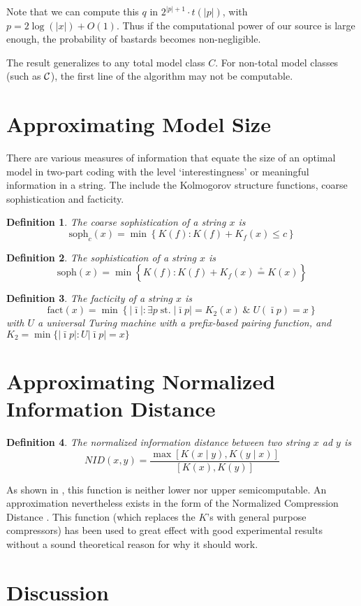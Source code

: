 \documentclass[10pt,a4paper,oneside]{article}
\newtheorem{dfn}{Definition}
\begin{document}
Note that we can compute this $q$ in $2^{|p|+1}\cdot t(|p|)$, with $p = 2 \log(|x|) + O(1)$. Thus if the computational power of our source is large enough, the probability of bastards becomes non-negligible.

The result generalizes to any total model class $C$. For non-total model classes (such as $\cal C$), the first line of the algorithm may not be computable. 


\section*{Approximating Model Size}

There are various measures of information that equate the size of an optimal model in two-part coding with the level `interestingness' or meaningful information in a string. The include the Kolmogorov structure functions, coarse sophistication and facticity.

\begin{dfn}{\cite{}}
The \emph{coarse sophistication} of a string $x$ is 
\[
	\text{soph}_c(x) = \min \left \{ K(f) : K(f) + K_f(x) \leq c \right \}
\]
\end{dfn}

\begin{dfn}{\cite{}}
The \emph{sophistication} of a string $x$ is 
\[
	\text{soph}(x) = \min \left \{ K(f) : K(f) + K_f(x) \overset{\underset{+}{}}{=} K(x) \right \}
\]
\end{dfn}

\begin{dfn}{\cite{}}
The \emph{facticity}  of a string $x$ is 
\[
\text{fact}(x) = \min \left\{ |\bar{\imath}| : \exists p \;\text{st.}\; |\bar{\imath}p| = K_2(x) \;\&\; U(\bar{\imath}p) = x\right\}
\] with $U$ a universal Turing machine with a prefix-based pairing function, and $K_2 = \min \{|\bar{\imath}p| : U|\bar{\imath}p| = x\}$
\end{dfn}

\section*{Approximating Normalized Information Distance}

\begin{dfn}
The normalized information distance between two string $x$ ad $y$ is 
\[
NID(x, y) = \frac{\max \left [ K(x\mid y), K(y\mid x)\right]}{\left[ K(x), K(y)\right]} 
\]
\end{dfn}

As shown in \cite{}, this function is neither lower nor upper semicomputable. An approximation nevertheless exists in the form of the Normalized Compression Distance \cite{}. This function (which replaces the $K$'s with general purpose compressors) has been used to great effect with good experimental results without a sound theoretical reason for why it should work.

\section*{Discussion}

\nocite{*}


\end{document}
